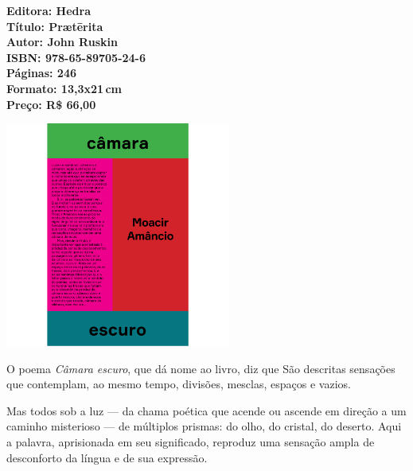 \vfill
\noindent\begin{minipage}[c]{1\linewidth}
{\small\textbf{
\hspace*{-.1cm}Editora: Hedra\\
Título: Prætērita\\
Autor: John Ruskin\\ 
ISBN: 978-65-89705-24-6\\
Páginas: 246\\
Formato: 13,3x21\,cm\\
Preço: R\$ 66,00\\
}}
\end{minipage}
\pagebreak

\begin{center}
\hspace*{-3.6cm}
\hspace*{3.1cm}\includegraphics[width=74mm]{./CAPAS/HEDRA_CAMARA.jpg}
\end{center}
\hspace*{-7cm}\hrulefill\hspace*{-7cm}
\medskip

\noindent{}O poema \textit{Câmara escuro}, que dá nome ao livro, diz que  São descritas sensações que contemplam, ao mesmo tempo, divisões, mesclas, espaços e vazios. 

Mas todos sob a luz --- da chama poética que acende ou ascende em direção a um caminho misterioso --- de múltiplos prismas: do olho, do cristal, do deserto. Aqui a palavra, aprisionada em seu significado, reproduz uma sensação ampla de desconforto da língua e de sua expressão.

